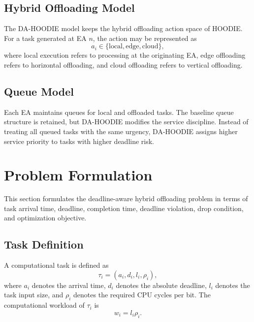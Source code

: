 \documentclass{article}
\begin{document}
\subsection{Hybrid Offloading Model}
\label{subsec:hybrid_offloading_model}

The DA-HOODIE model keeps the hybrid offloading action space of HOODIE. For a task generated at EA $n$, the action may be represented as
\begin{equation}
    a_i \in \{\mathrm{local},\mathrm{edge},\mathrm{cloud}\},
\end{equation}
where local execution refers to processing at the originating EA, edge offloading refers to horizontal offloading, and cloud offloading refers to vertical offloading.

\subsection{Queue Model}
\label{subsec:queue_model}

Each EA maintains queues for local and offloaded tasks. The baseline queue structure is retained, but DA-HOODIE modifies the service discipline. Instead of treating all queued tasks with the same urgency, DA-HOODIE assigns higher service priority to tasks with higher deadline risk.

\section{Problem Formulation}
\label{sec:problem_formulation}

This section formulates the deadline-aware hybrid offloading problem in terms of task arrival time, deadline, completion time, deadline violation, drop condition, and optimization objective.

\subsection{Task Definition}
\label{subsec:task_definition}

A computational task is defined as
\begin{equation}
    \tau_i=(a_i,d_i,l_i,\rho_i),
\end{equation}
where $a_i$ denotes the arrival time, $d_i$ denotes the absolute deadline, $l_i$ denotes the task input size, and $\rho_i$ denotes the required CPU cycles per bit. The computational workload of $\tau_i$ is
\begin{equation}
    w_i=l_i\rho_i.
\end{equation}
\end{document}

